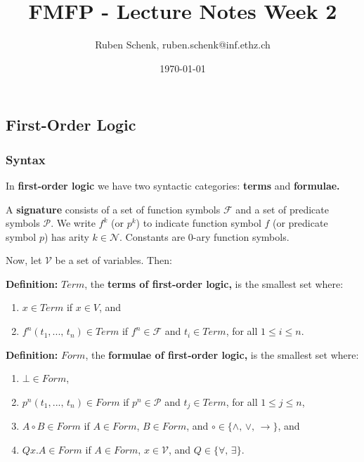 \documentclass[a4paper]{extarticle}
\title{FMFP - Lecture Notes Week 2}
\author{Ruben Schenk, ruben.schenk@inf.ethz.ch}
\date{\today}
\begin{document}
\maketitle
\newpage

\subsection{First-Order Logic}

\subsubsection{Syntax}

In \textbf{first-order logic} we have two syntactic categories: \textbf{terms} and \textbf{formulae.}

A \textbf{signature} consists of a set of function symbols \(\mathcal{F}\) and a set of predicate symbols \(\mathcal{P}\).
We write \(f^k\) (or \(p^k\)) to indicate function symbol \(f\) (or predicate symbol \(p\)) has arity \(k \in \mathcal{N}\). Constants are \(0\)-ary function symbols.

Now, let \(\mathcal{V}\) be a set of variables. Then:

\begin{tbox}
    \textbf{Definition:} \(Term\), the \textbf{terms of first-order logic,} is the smallest set where:
    \begin{enumerate}
        \item \(x \in Term\) if \(x \in V\), and
        \item \(f^n(t_1,..., \, t_n) \in Term\) if \(f^n \in \mathcal{F}\) and \(t_i \in Term\), for all \(1 \leq i \leq n\).
    \end{enumerate}
\end{tbox}

\begin{tbox}
    \textbf{Definition:} \(Form\), the \textbf{formulae of first-order logic,} is the smallest set where:
    \begin{enumerate}
        \item \(\bot \in Form\),
        \item \(p^n(t_1,..., \, t_n) \in Form\) if \(p^n \in \mathcal{P}\) and \(t_j \in Term\), for all \(1 \leq j \leq n\),
        \item \(A \circ B \in Form\) if \(A \in Form\), \(B \in Form\), and \(\circ \in \{\land, \, \lor, \, \to\}\), and
        \item \(Qx.A \in Form\) if \(A \in Form\), \(x \in \mathcal{V}\), and \(Q \in \{\forall, \, \exists\}\).
    \end{enumerate}
\end{tbox}
\end{document}
